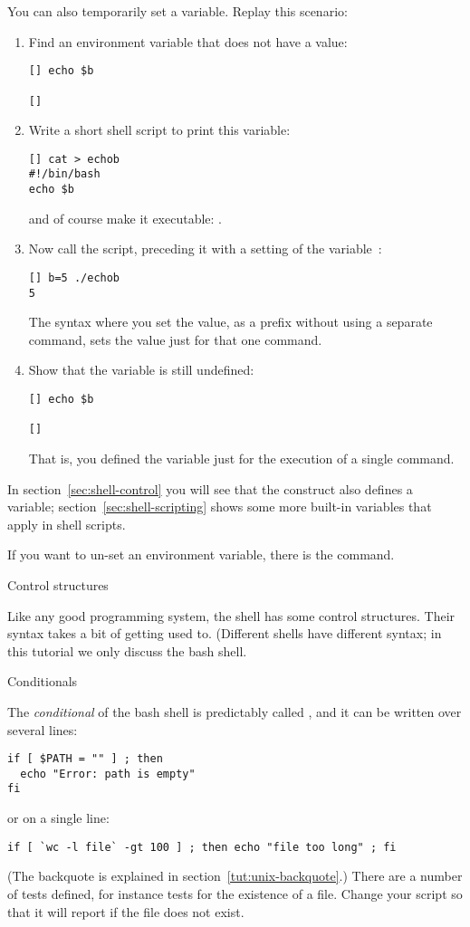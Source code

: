 You can also temporarily set a variable. Replay this scenario:
\begin{enumerate}
\item Find an environment variable that does not have a value:
\begin{verbatim}
[] echo $b

[]
\end{verbatim}
\item Write a short shell script to print this variable:
\begin{verbatim}
[] cat > echob
#!/bin/bash
echo $b
\end{verbatim}
and of course make it executable: .
\item Now call the script, preceding it with a setting of the variable~:
\begin{verbatim}
[] b=5 ./echob
5
\end{verbatim}
The syntax where you set the value, as a prefix without using a separate
command, sets the value just for that one command.
\item Show that the variable is still undefined:
\begin{verbatim}
[] echo $b

[]
\end{verbatim}
That is, you defined the variable just for the execution of a single command.
\end{enumerate}

In  section~\ref{sec:shell-control} you will see that the  construct
also defines a variable; section~\ref{sec:shell-scripting}
shows some more built-in variables that apply in shell scripts.

If you want to un-set an environment variable,
there is the  command.


 {Control structures}
\label{sec:shell-control}

Like any good programming system, the shell has some control
structures. Their syntax takes a bit of getting used to. (Different
shells have different syntax; in this tutorial we only discuss the
bash shell.

 {Conditionals}

The \emph{conditional} of the bash shell is predictably called
, and it can be written over several
lines:
\begin{verbatim}
if [ $PATH = "" ] ; then
  echo "Error: path is empty"
fi
\end{verbatim}
or on a single line:
\begin{verbatim}
if [ `wc -l file` -gt 100 ] ; then echo "file too long" ; fi
\end{verbatim}
(The backquote is explained in section~\ref{tut:unix-backquote}.)
There are a number of tests defined, for instance 
tests for the existence of a file. Change your script so that it will
report  if the file does not exist.

